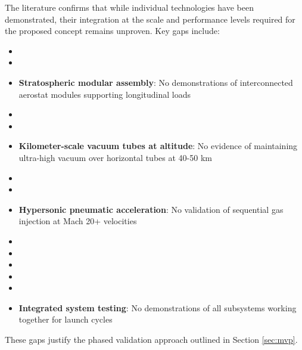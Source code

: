 The literature confirms that while individual technologies have been demonstrated, their integration at the scale and performance levels required for the proposed concept remains unproven. Key gaps include:
\begin{itemize}
    \item \item \item \textbf{Stratospheric modular assembly}: No demonstrations of interconnected aerostat modules supporting longitudinal loads
    \item \item \item \textbf{Kilometer-scale vacuum tubes at altitude}: No evidence of maintaining ultra-high vacuum over horizontal tubes at 40-50 km
    \item \item \item \textbf{Hypersonic pneumatic acceleration}: No validation of sequential gas injection at Mach 20+ velocities
    \item \item \item \item \item \item \textbf{Integrated system testing}: No demonstrations of all subsystems working together for launch cycles
\end{itemize}
These gaps justify the phased validation approach outlined in Section \ref{sec:mvp}.
